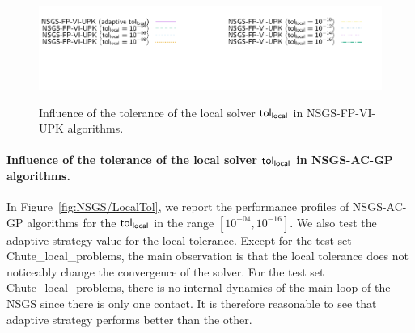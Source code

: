 \begin{figure}
\\
{\includegraphics[width=\legendwidth]{../figure/NSGS/LocalTol/VI/1.0e-08/50/time/profile-Chain_legend.pdf}} 
\caption{Influence of the tolerance of the local solver $\sf tol_{local}$ in {\sf NSGS-FP-VI-UPK} algorithms.}
 \label{fig:NSGS/LocalTol/VI}
\end{figure}

\paragraph{Influence of the tolerance of the local solver $\sf tol_{local}$ in {\sf NSGS-AC-GP} algorithms.}
In Figure~\ref{fig:NSGS/LocalTol},  we report the performance profiles of {\sf NSGS-AC-GP} algorithms for the $\sf tol_{local}$ in the range $[10^{-04}, 10^{-16}]$. We also test the  adaptive strategy value for the local tolerance. Except for the test set Chute\_local\_problems,  the main observation is that the local tolerance does not noticeably change the convergence of the solver. For the test set Chute\_local\_problems, there is no internal dynamics of the main loop of the {\sf NSGS} since there is only one contact. It is therefore reasonable to see that adaptive strategy performs better than the other.



